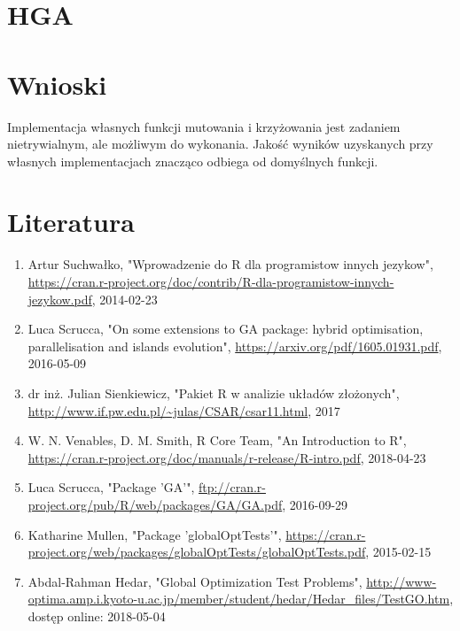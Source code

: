 \documentclass{article}
\begin{document}
    \section{HGA}
    
    
    \clearpage
\section{Wnioski}

Implementacja własnych funkcji mutowania i krzyżowania jest  zadaniem nietrywialnym, ale możliwym do wykonania.  Jakość wyników uzyskanych przy własnych implementacjach znacząco odbiega od domyślnych funkcji.


\section{Literatura}
\begin{enumerate}
\item Artur Suchwałko, "Wprowadzenie do R dla programistow innych jezykow", \url{https://cran.r-project.org/doc/contrib/R-dla-programistow-innych-jezykow.pdf}, 2014-02-23
\item Luca Scrucca, "On some extensions to GA package:
hybrid optimisation, parallelisation and islands evolution", \url{https://arxiv.org/pdf/1605.01931.pdf}, 2016-05-09
\item dr inż. Julian Sienkiewicz, "Pakiet R w analizie układów złożonych", \url{http://www.if.pw.edu.pl/~julas/CSAR/csar11.html}, 2017
\item W. N. Venables, D. M. Smith, R Core Team, "An Introduction to R", \url{https://cran.r-project.org/doc/manuals/r-release/R-intro.pdf}, 2018-04-23
\item Luca Scrucca, "Package 'GA'", \url{ftp://cran.r-project.org/pub/R/web/packages/GA/GA.pdf}, 2016-09-29
\item Katharine Mullen, "Package 'globalOptTests'", \url{https://cran.r-project.org/web/packages/globalOptTests/globalOptTests.pdf},
2015-02-15
\item Abdal-Rahman Hedar, "Global Optimization Test Problems", \url{http://www-optima.amp.i.kyoto-u.ac.jp/member/student/hedar/Hedar_files/TestGO.htm}, dostęp online: 2018-05-04
\end{enumerate}
\end{document}
